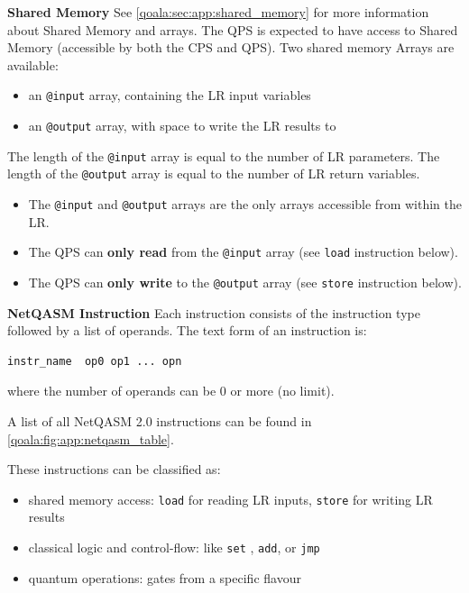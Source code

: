 \textbf{Shared Memory}
See \cref{qoala:sec:app:shared_memory} for more information about Shared Memory and arrays.
The QPS is expected to have access to Shared Memory (accessible by both the CPS and QPS).
Two shared memory Arrays are available:
\begin{itemize}
\item an \texttt{@input} array, containing the LR input variables
\item an \texttt{@output} array, with space to write the LR results to
\end{itemize}

The length of the \texttt{@input} array is equal to the number of LR parameters.
The length of the \texttt{@output} array is equal to the number of LR return variables.

\begin{itemize}
\item The \texttt{@input} and \texttt{@output} arrays are the only arrays accessible from within the LR.
\item The QPS can \textbf{only read} from the \texttt{@input} array (see \texttt{load} instruction below).
\item The QPS can \textbf{only write} to the \texttt{@output} array (see \texttt{store} instruction below).
\end{itemize}

\textbf{NetQASM Instruction}
Each instruction consists of the instruction type followed by a list of operands.
The text form of an instruction is:

\begin{lstlisting}
instr_name  op0 op1 ... opn
\end{lstlisting}

where the number of operands can be 0 or more (no limit).

A list of all NetQASM 2.0 instructions can be found in \cref{qoala:fig:app:netqasm_table}.

These instructions can be classified as:
\begin{itemize}
\item shared memory access: \texttt{load} for reading LR inputs, \texttt{store} for writing LR results
\item classical logic and control-flow: like \texttt{set} , \texttt{add}, or \texttt{jmp}
\item quantum operations: gates from a specific flavour~\cite{dahlberg2022netqasm}
\end{itemize}

